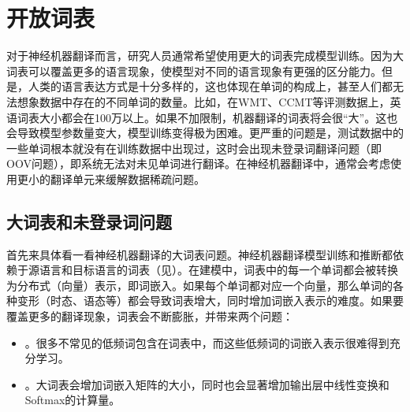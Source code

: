 
\sectionnewpage
\section{开放词表}

\parinterval 对于神经机器翻译而言，研究人员通常希望使用更大的词表完成模型训练。因为大词表可以覆盖更多的语言现象，使模型对不同的语言现象有更强的区分能力。但是，人类的语言表达方式是十分多样的，这也体现在单词的构成上，甚至人们都无法想象数据中存在的不同单词的数量。比如，在WMT、CCMT等评测数据上，英语词表大小都会在100万以上。如果不加限制，机器翻译的词表将会很“大”。这也会导致模型参数量变大，模型训练变得极为困难。更严重的问题是，测试数据中的一些单词根本就没有在训练数据中出现过，这时会出现未登录词翻译问题（即OOV问题），即系统无法对未见单词进行翻译。在神经机器翻译中，通常会考虑使用更小的翻译单元来缓解数据稀疏问题。


\subsection{大词表和未登录词问题}

\parinterval 首先来具体看一看神经机器翻译的大词表问题。神经机器翻译模型训练和推断都依赖于源语言和目标语言的词表（见{\chapterten}）。在建模中，词表中的每一个单词都会被转换为分布式（向量）表示，即词嵌入。如果每个单词都对应一个向量，那么单词的各种变形（时态、语态等）都会导致词表增大，同时增加词嵌入表示的难度。如果要覆盖更多的翻译现象，词表会不断膨胀，并带来两个问题：

\begin{itemize}
\vspace{0.5em}
\item {\small{}}。很多不常见的低频词包含在词表中，而这些低频词的词嵌入表示很难得到充分学习。
\vspace{0.5em}
\item {\small{}}。大词表会增加词嵌入矩阵的大小，同时也会显著增加输出层中线性变换和Softmax的计算量。
\vspace{0.5em}
\end{itemize}

